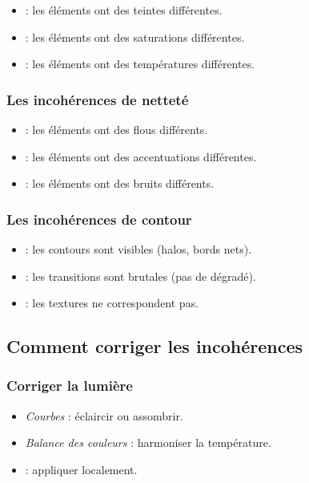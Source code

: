 \begin{itemize}
    \item {} : les éléments ont des teintes différentes.
    \item {} : les éléments ont des saturations différentes.
    \item {} : les éléments ont des températures différentes.
\end{itemize}

\subsubsection{Les incohérences de netteté}

\begin{itemize}
    \item {} : les éléments ont des flous différents.
    \item {} : les éléments ont des accentuations différentes.
    \item {} : les éléments ont des bruits différents.
\end{itemize}

\subsubsection{Les incohérences de contour}

\begin{itemize}
    \item {} : les contours sont visibles (halos, bords nets).
    \item {} : les transitions sont brutales (pas de dégradé).
    \item {} : les textures ne correspondent pas.
\end{itemize}

\subsection{Comment corriger les incohérences}

\subsubsection{Corriger la lumière}

\begin{itemize}
    \item {} \emph{Courbes} : éclaircir ou assombrir.
    \item {} \emph{Balance des couleurs} : harmoniser la température.
    \item {} : appliquer localement.
\end{itemize}

